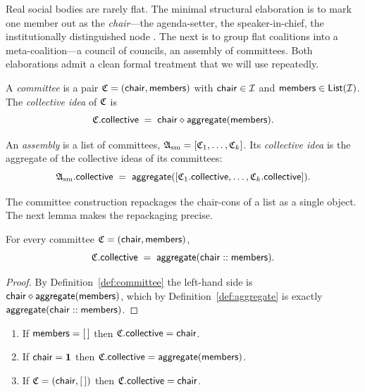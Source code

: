 Real social bodies are rarely flat. The minimal structural
elaboration is to mark one member out as the \emph{chair}---the
agenda-setter, the speaker-in-chief, the institutionally
distinguished node \cite{Sen1970, ListPettit2011}. The next is to
group flat coalitions into a meta-coalition---a council of councils,
an assembly of committees. Both elaborations admit a clean formal
treatment that we will use repeatedly.

\begin{definition}[Committee]\label{def:committee}
A \emph{committee} is a pair $\mathfrak{C} = (\mathsf{chair}, \mathsf{members})$ with
$\mathsf{chair} \in \mathcal{I}$ and $\mathsf{members} \in \mathsf{List}(\mathcal{I})$. The
\emph{collective idea} of $\mathfrak{C}$ is
\[
  \mathfrak{C}.\mathsf{collective} \;=\; \mathsf{chair} \mathbin{\diamond} \mathsf{aggregate}(\mathsf{members}).
\]
\end{definition}

\begin{definition}[Assembly]\label{def:assembly}
An \emph{assembly} is a list of committees, $\mathfrak{A}_{\mathrm{sm}} = [\mathfrak{C}_1,
\ldots, \mathfrak{C}_k]$. Its \emph{collective idea} is the aggregate of
the collective ideas of its committees:
\[
  \mathfrak{A}_{\mathrm{sm}}.\mathsf{collective} \;=\; \mathsf{aggregate}([\mathfrak{C}_1.\mathsf{collective}, \ldots,
  \mathfrak{C}_k.\mathsf{collective}]).
\]
\end{definition}

The committee construction repackages the chair-cons of a list as a
single object. The next lemma makes the repackaging precise.

\begin{lemma}\label{lem:chair-eq}
For every committee $\mathfrak{C} = (\mathsf{chair}, \mathsf{members})$,
\[
  \mathfrak{C}.\mathsf{collective} \;=\; \mathsf{aggregate}(\mathsf{chair} :: \mathsf{members}).
\]
\end{lemma}

\begin{proof}
By Definition~\ref{def:committee} the left-hand side is $\mathsf{chair}
\mathbin{\diamond} \mathsf{aggregate}(\mathsf{members})$, which by Definition~\ref{def:aggregate}
is exactly $\mathsf{aggregate}(\mathsf{chair} :: \mathsf{members})$.
\end{proof}

\begin{lemma}\label{lem:comm-edge}
\begin{enumerate}
\item If $\mathsf{members} = [\,]$ then $\mathfrak{C}.\mathsf{collective} = \mathsf{chair}$.
\item If $\mathsf{chair} = \mathbf{1}$ then $\mathfrak{C}.\mathsf{collective} = \mathsf{aggregate}(\mathsf{members})$.
\item If $\mathfrak{C} = (\mathsf{chair}, [\,])$ then $\mathfrak{C}.\mathsf{collective} = \mathsf{chair}$.
\end{enumerate}
\end{lemma}

